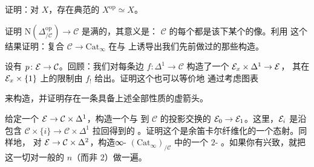 \begin{exercise}\label{ex:groupoid-op-equivalent}
证明：对\trInfinityGroupoid{} $X$，存在典范的\trJoyalEquivalence{}%
$X^{\mathrm{op}} \simeq X$。
\end{exercise}

\begin{exercise}\label{ex:delta-op-full}
证明\trFunctor{}%
$\mathrm{N}(\Delta^{\mathrm{op}}_{/\mathcal{C}}) \to \mathcal{C}$ 是满的，其意义是：
$\mathcal{C}$ 的每个\trMorphism{}都是该\trFunctor{}下某个\trMorphism{}的像。利用
这个结果证明：复合 $\mathcal{C} \to \mathrm{Cat}_{\infty}$ 在\trObject{}与%
\trMorphism{}上诱导出我们先前做过的那些构造。
\end{exercise}

\begin{exercise}\label{ex:cocartesian-pushforward-diagram}
设有\trCocartesianFibration{} $p\colon \mathcal{E} \to \mathcal{C}$。回顾：我们对每条边
$f\colon \Delta^1 \to \mathcal{C}$ 构造了一个\trFunctor{} $\mathcal{E}_x \times \Delta^1 \to \mathcal{E}$，
其在 $\mathcal{E}_x \times \{1\}$ 上的限制由 $f_!$ 给出。证明这个\trFunctor{}也可以等价地
通过考虑图表
\begin{center}
\end{center}
来构造，并证明存在一条具备上述全部性质的虚箭头。
\end{exercise}

\begin{exercise}\label{ex:cocartesian-family}
给定一个\trCocartesianFibration{} $\mathcal{E} \to \mathcal{C} \times \Delta^1$，构造一个与
到 $\mathcal{C}$ 的投影交换的\trFunctor{} $\mathcal{E}_0 \to \mathcal{E}_1$。这里，$\mathcal{E}_i$ 是沿包含
$\mathcal{C} \times \{i\} \to \mathcal{C} \times \Delta^1$ 拉回得到的%
\trCocartesianFibration{}。证明这个\trFunctor{}是余笛卡尔纤维化的一个态射。同样地，
对\trCocartesianFibration{} $\mathcal{E} \to \mathcal{C} \times \Delta^2$，构造∞-%
\trCategory{} $(\mathrm{Cat}_{\infty})_{/\mathcal{C}}$ 中的一个 $2$-%
\trSimplex{}。如果你有兴致，就把这一切对一般的 $n$（而非 $2$）做一遍。
\end{exercise}

